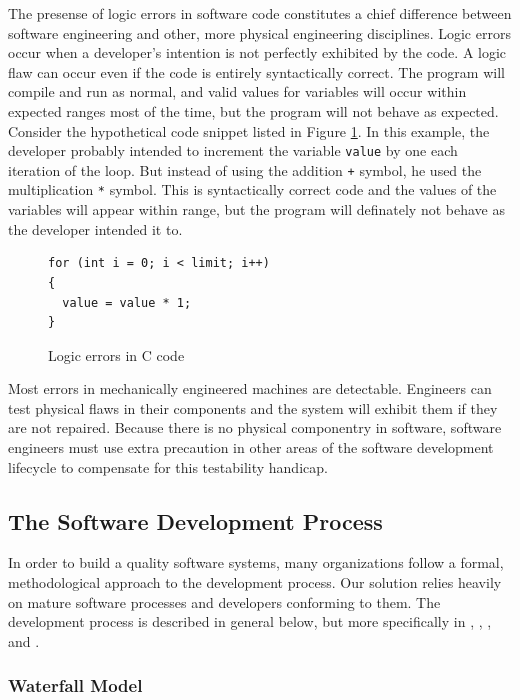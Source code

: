 The presense of logic errors in software code constitutes a chief difference
between software engineering and other, more physical engineering disciplines.
Logic errors occur when a developer's intention is not perfectly exhibited by
the code. A logic flaw can occur even if the code is entirely syntactically
correct. The program will compile and run as normal, and valid values for
variables will occur within expected ranges most of the time, but the program
will not behave as expected. Consider the hypothetical code snippet listed in
Figure \ref{fig:logic_bug}. In this example, the developer probably intended to
increment the variable \verb!value! by one each iteration of the loop. But
instead of using the addition \verb!+! symbol, he used the multiplication
\verb!*! symbol. This is syntactically correct code and the values of the
variables will appear within range, but the program will definately not behave
as the developer intended it to.

\begin{figure}
\singlespacing
\makebox[\textwidth]{\hrulefill}
\begin{lstlisting}
for (int i = 0; i < limit; i++)
{
  value = value * 1;
}
\end{lstlisting}
\makebox[\textwidth]{\hrulefill}
\doublespacing
\caption{Logic errors in C code}
\label{fig:logic_bug}
\end{figure}

Most errors in mechanically engineered machines are detectable. Engineers can
test physical flaws in their components and the system will exhibit them if they
are not repaired. Because there is no physical componentry in software,
software engineers must use extra precaution in other areas of the software
development lifecycle to compensate for this testability handicap.

\subsection{The Software Development Process}
In order to build a quality software systems, many organizations follow a
formal, methodological approach to the development process. Our solution relies
heavily on mature software processes and developers conforming to them. The
development process is described in general below, but more specifically in 
\cite{Royce1970}, \cite{Boehm1986}, \cite{CMM11}, and \cite{Kehoe1996}.


\subsubsection{Waterfall Model}\label{waterfall}

